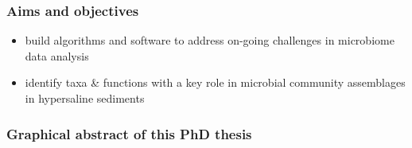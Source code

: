 \documentclass{beamer}
\begin{document}
   \begin{frame}
      \frametitle{Aims and objectives}
      \begin{itemize}
         \item  build algorithms and software to address on-going challenges in microbiome data analysis
         \bigskip
         \item  identify taxa \& functions with a key role in microbial community assemblages in hypersaline sediments
      \end{itemize}
   \end{frame}

   \begin{frame}
      \frametitle{Graphical abstract of this PhD thesis}
   \end{frame}
\end{document}
